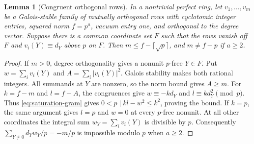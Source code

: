 \documentclass[11pt]{amsart}
\numberwithin{equation}{section}
\newtheorem{lemma}[theorem]{Lemma}
\theoremstyle{definition}
\theoremstyle{plain}
\begin{document}
\begin{lemma}[Congruent orthogonal rows]\label{lem:congruent-rows}
In a nontrivial perfect ring, let $v_1,\ldots,v_m$ be a Galois-stable family of mutually
orthogonal rows with cyclotomic integer entries, squared norm
$f=p^a$, vacuum entry one, and orthogonal to the degree vector.
Suppose there is a common coordinate set $F$ such that the rows
vanish off $F$ and $v_i(Y)\equiv d_Y$ above $p$ on $F$.
Then $m\le f-\lceil\sqrt p\rceil$, and $m\ne f-p$ if $a\ge2$.
\end{lemma}
\begin{proof}
If $m>0$, degree orthogonality gives a nonunit $p$-free $Y\in F$.
Put $w=\sum_i v_i(Y)$ and $A=\sum_i|v_i(Y)|^2$.
Galois stability makes both rational integers. All summands at $Y$
are nonzero, so the norm bound gives $A\ge m$.
For $k=f-m$ and $l=f-A$, the congruences give
$w\equiv-kd_Y$ and $l\equiv kd_Y^2\pmod p$.
Thus \eqref{eq:saturation-gram} gives
$0<p\mid kl-w^2\le k^2$, proving the bound.
If $k=p$, the same argument gives $l=p$ and $w=0$ at every
$p$-free nonunit. At all other coordinates the integral sum
$w_Y=\sum_i v_i(Y)$ is divisible by $p$.
Consequently $\sum_{Y\ne0}d_Yw_Y/p=-m/p$ is impossible modulo
$p$ when $a\ge2$.
\end{proof}
\end{document}

